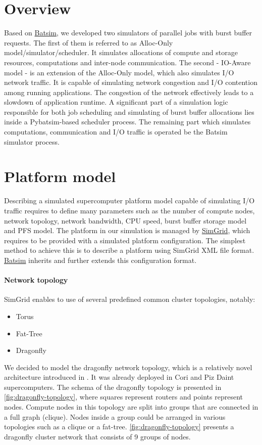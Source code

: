 \documentclass[thesis-en.tex]{subfiles}
\begin{document}
\section{Overview}
Based on \hyperref[sec:batsim]{Batsim}, we developed two simulators of parallel jobs with burst buffer requests. The first of them is referred to as Alloc-Only model/simulator/scheduler. It simulates allocations of compute and storage resources, computations and inter-node communication. The second - IO-Aware model - is an extension of the Alloc-Only model, which also simulates I/O network traffic. It is capable of simulating network congestion and I/O contention among running applications. The congestion of the network effectively leads to a slowdown of application runtime. 
A significant part of a simulation logic responsible for both job scheduling and simulating of burst buffer allocations lies inside a Pybatsim-based scheduler process. The remaining part which simulates computations, communication and I/O traffic is operated be the Batsim simulator process.

\section{Platform model} \label{sec:platform}
Describing a simulated supercomputer platform model capable of simulating I/O traffic requires to define many parameters such as the number of compute nodes, network topology, network bandwidth, CPU speed, burst buffer storage model and PFS model. The platform in our simulation is managed by \hyperref[sec:simgrid]{SimGrid}, which requires to be provided with a simulated platform configuration. The simplest method to achieve this is to describe a platform using SimGrid XML file format. \hyperref[sec:batsim]{Batsim} inherits and further extends this configuration format. 

\paragraph{Network topology} \label{sec:network}
SimGrid enables to use of several predefined common cluster topologies, notably:
\begin{itemize}
    \item Torus
    \item Fat-Tree
    \item Dragonfly
\end{itemize}

We decided to model the dragonfly network topology, which is a relatively novel architecture introduced in \cite{kim2008technology}. It was already deployed in Cori \cite{bhimji2016accelerating} and Piz Daint \cite{piz-daint} supercomputers. The schema of the dragonfly topology is presented in \autoref{fig:dragonfly-topology}, where squares represent routers and points represent nodes. Compute nodes in this topology are split into groups that are connected in a full graph (clique). Nodes inside a group could be arranged in various topologies such as a clique or a fat-tree. \autoref{fig:dragonfly-topology} presents a dragonfly cluster network that consists of 9 groups of nodes.
\end{document}
